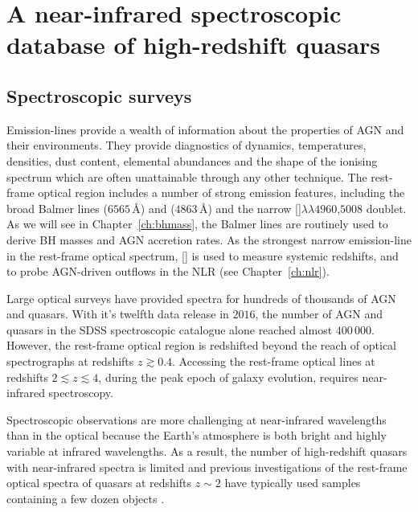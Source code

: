 
\chapter{A near-infrared spectroscopic database of high-redshift quasars}
\label{ch:nirsample}

\section{Spectroscopic surveys}

Emission-lines provide a wealth of information about the properties of AGN and their environments. 
They provide diagnostics of dynamics, temperatures, densities, dust content, elemental abundances and the shape of the ionising spectrum which are often unattainable through any other technique. 
The rest-frame optical region includes a number of strong emission features, including the broad Balmer lines \ha ($6565$\,\AA) and \hb ($4863$\,\AA) and the narrow []$\lambda\lambda$$4960$,$5008$ doublet.
As we will see in Chapter~\ref{ch:bhmass}, the Balmer lines are routinely used to derive BH masses and AGN accretion rates. 
As the strongest narrow emission-line in the rest-frame optical spectrum, [] is used to measure systemic redshifts, and to probe AGN-driven outflows in the NLR (see Chapter~\ref{ch:nlr}). 

Large optical surveys have provided spectra for hundreds of thousands of AGN and quasars. 
With it's twelfth data release in $2016$, the number of AGN and quasars in the SDSS spectroscopic catalogue alone reached almost $400\,000$. 
However, the rest-frame optical region is redshifted beyond the reach of optical spectrographs at redshifts $z \gtrsim0.4$. 
Accessing the rest-frame optical lines at redshifts $2 \lesssim z \lesssim 4$, during the peak epoch of galaxy evolution, requires near-infrared spectroscopy.  

Spectroscopic observations are more challenging at near-infrared wavelengths than in the optical because the Earth's atmosphere is both bright and highly variable at infrared wavelengths. 
As a result, the number of high-redshift quasars with near-infrared spectra is limited and previous investigations of the rest-frame optical spectra of quasars at redshifts $z\sim2$ have typically used samples containing a few dozen objects \citep[e.g.][]{marziani09,shen12,shen16a}. 

